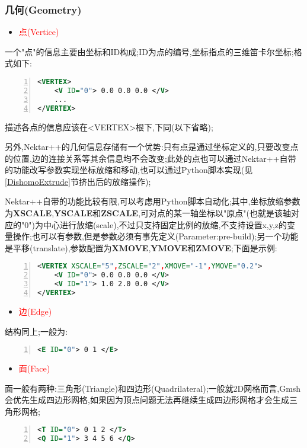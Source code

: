 \subsubsection{几何(Geometry)}
\begin{itemize}
	\item{\textcolor{red}{点(Vertice)}}
\end{itemize}

一个"点"的信息主要由坐标和ID构成;ID为点的编号,坐标指点的三维笛卡尔坐标;格式如下:
\begin{lstlisting}[frame=single,numbers=left,language=XML]
<VERTEX>
	<V ID="0"> 0.0 0.0 0.0 </V>
	...
</VERTEX>
\end{lstlisting}
\par
描述各点的信息应该在<VERTEX>根下,下同(以下省略);\par
另外,Nektar++的几何信息存储有一个优势:只有点是通过坐标定义的,只要改变点的位置,边的连接关系等其余信息均不会改变;此处的点也可以通过Nektar++自带的功能改写参数实现坐标放缩和移动,也可以通过Python脚本实现(见\ref{DishomoExtrude}节挤出后的放缩操作);\par
Nektar++自带的功能比较有限,可以考虑用Python脚本自动化;其中,坐标放缩参数为\textbf{XSCALE},\textbf{YSCALE}和\textbf{ZSCALE},可对点的某一轴坐标以"原点"(也就是该轴对应的"0")为中心进行放缩(scale),不过只支持固定比例的放缩,不支持设置x,y,z的变量操作;也可以有参数,但是参数必须有事先定义(Parameter:pre-build);另一个功能是平移(translate),参数配置为\textbf{XMOVE},\textbf{YMOVE}和\textbf{ZMOVE};下面是示例:
\begin{lstlisting}[frame=single,numbers=left,language=XML]
<VERTEX XSCALE="5",ZSCALE="2",XMOVE="-1",YMOVE="0.2">
	<V ID="0"> 0.0 0.0 0.0 </V>
	<V ID="1"> 1.0 2.0 0.0 </V>
</VERTEX>
\end{lstlisting}
\par

\begin{itemize}
	\item{\textcolor{red}{边(Edge)}}
\end{itemize}

结构同上;一般为:\par
\begin{lstlisting}[frame=single,numbers=left,language=XML]
<E ID="0"> 0 1 </E>
\end{lstlisting}
\par

\begin{itemize}
	\item{\textcolor{red}{面(Face)}}
\end{itemize}
\par
面一般有两种:三角形(Triangle)和四边形(Quadrilateral);一般就2D网格而言,Gmsh会优先生成四边形网格,如果因为顶点问题无法再继续生成四边形网格才会生成三角形网格;
\begin{lstlisting}[frame=single,numbers=left,language=XML]
<T ID="0"> 0 1 2 </T>
<Q ID="1"> 3 4 5 6 </Q>

\end{lstlisting}
\par


